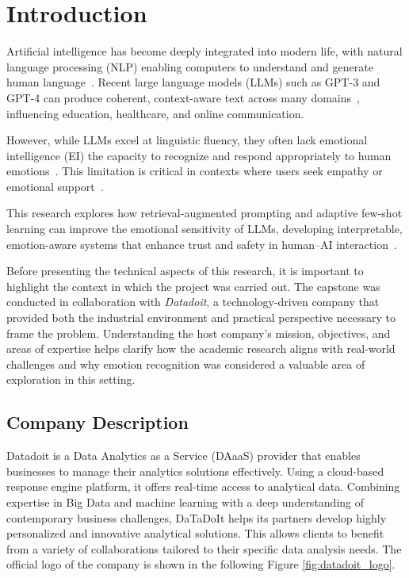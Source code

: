 
\chapter{Introduction}
\label{chap:intro}

\noindent Artificial intelligence has become deeply integrated into modern life, with natural language processing (NLP) enabling computers to understand and generate human language~\cite{hirschberg2015advances}. Recent large language models (LLMs) such as GPT-3 and GPT-4 can produce coherent, context-aware text across many domains~\cite{brown2020gpt3, openai2023gpt4}, influencing education, healthcare, and online communication.

\smallskip
\noindent However, while LLMs excel at linguistic fluency, they often lack emotional intelligence (EI) the capacity to recognize and respond appropriately to human emotions~\cite{salovey1990emotional, goleman1995ei}. This limitation is critical in contexts where users seek empathy or emotional support~\cite{fitzpatrick2017woebot, larsen2022ai}.

\smallskip
\noindent This research explores how retrieval-augmented prompting and adaptive few-shot learning can improve the emotional sensitivity of LLMs, developing interpretable, emotion-aware systems that enhance trust and safety in human--AI interaction~\cite{demszky2020goemotions, zhou2023emotional}.

\smallskip
\noindent Before presenting the technical aspects of this research, it is important to highlight the context in which the project was carried out. The capstone was conducted in collaboration with \textit{Datadoit}, a technology-driven company that provided both the industrial environment and practical perspective necessary to frame the problem. Understanding the host company’s mission, objectives, and areas of expertise helps clarify how the academic research aligns with real-world challenges and why emotion recognition was considered a valuable area of exploration in this setting.  
\section{Company Description}
Datadoit\cite{datadoit} is a Data Analytics as a Service (DAaaS) provider that enables businesses to manage their analytics solutions effectively. Using a cloud-based response engine platform, it offers real-time access to analytical data. Combining expertise in Big Data and machine learning with a deep understanding of contemporary business challenges, DaTaDoIt helps its partners develop highly personalized and innovative analytical solutions. This allows clients to benefit from a variety of collaborations tailored to their specific data analysis needs. The official logo of the company is shown in the following Figure \ref{fig:datadoit_logo}.

